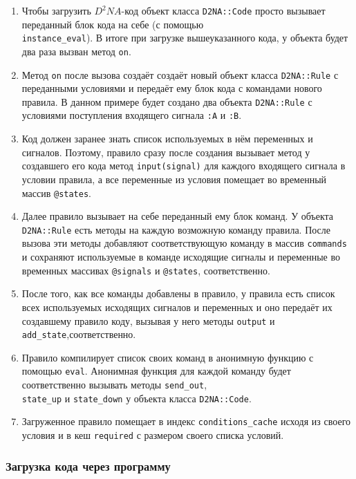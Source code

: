 \documentclass[utf8,a5paper,portrait,10pt,twoside]{eskdtext}
\begin{document}
\begin{enumerate}
  \item Чтобы загрузить $D^2NA$-код объект класса \texttt{D2NA::Code} просто
        вызывает переданный блок кода на себе (с помощью\\
        \texttt{instance\_eval}). В итоге при загрузке вышеуказанного кода, у
        объекта будет два раза вызван метод \texttt{on}.
  \item Метод \texttt{on} после вызова создаёт создаёт новый объект класса
        \texttt{D2NA::Rule} с переданными условиями и передаёт ему блок кода с
        командами нового правила. В данном примере будет создано два объекта
        \texttt{D2NA::Rule} с условиями поступления входящего сигнала
        \texttt{:A} и \texttt{:B}.
  \item Код должен заранее знать список используемых в нём переменных и
        сигналов. Поэтому, правило сразу после создания вызывает метод у
        создавшего его кода метод \texttt{input(signal)} для каждого входящего
        сигнала в условии правила, а все переменные из условия помещает во
        временный массив \texttt{@states}.
  \item Далее правило вызывает на себе переданный ему блок команд. У объекта
        \texttt{D2NA::Rule} есть методы на каждую возможную команду правила.
        После вызова эти методы добавляют соответствующую команду в массив
        \texttt{commands} и сохраняют используемые в команде исходящие сигналы и
        переменные во временных массивах \texttt{@signals} и \texttt{@states},
        соответственно.
  \item После того, как все команды добавлены в правило, у правила есть список
        всех используемых исходящих сигналов и переменных и оно передаёт их
        создавшему правило коду, вызывая у него методы \texttt{output} и
        \texttt{add\_state},соответственно.
  \item Правило компилирует список своих команд в анонимную функцию с помощью
        \texttt{eval}. Анонимная функция для каждой команду будет соответственно
        вызывать методы \texttt{send\_out},\\ \texttt{state\_up} и
        \texttt{state\_down} у объекта класса \texttt{D2NA::Code}.
  \item Загруженное правило помещает в индекс \texttt{conditions\_cache} исходя
        из своего условия и в кеш \texttt{required} с размером своего списка
        условий.
\end{enumerate}

\subsubsection{Загрузка кода через программу}
\end{document}
